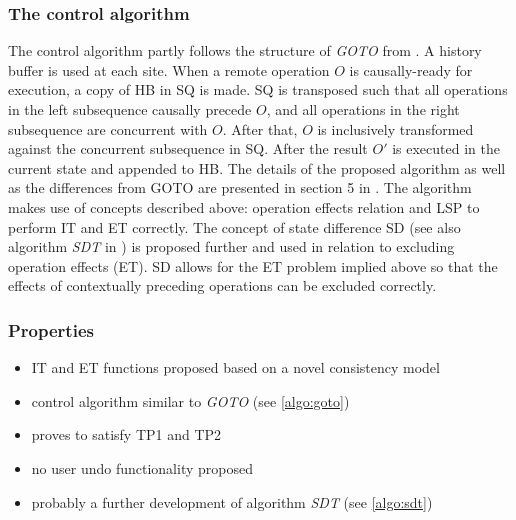 \subsubsection{The control algorithm}
The control algorithm partly follows the structure of \emph{GOTO} from \cite{sun98b}. A history buffer is used at each site. When a remote operation $O$ is causally-ready for execution, a copy of HB in SQ is made. SQ is transposed such that all operations in the left subsequence causally precede $O$, and all operations in the right subsequence are concurrent with $O$. After that, $O$ is inclusively transformed against the concurrent subsequence in SQ. After the result $O'$ is executed in the current state and appended to HB. The details of the proposed algorithm as well as the differences from GOTO are presented in section 5 in \cite{li04}. The algorithm makes use of concepts described above: operation effects relation and LSP to perform IT and ET correctly. The concept of state difference SD (see also algorithm \emph{SDT} in \cite{sdt}) is proposed further and used in relation to excluding operation effects (ET). SD allows for the ET problem implied above so that the effects of contextually preceding operations can be excluded correctly.

\subsubsection{Properties}
\begin{itemize}
 \item IT and ET functions proposed based on a novel consistency model
 \item control algorithm similar to \emph{GOTO} (see \ref{algo:goto})
 \item proves to satisfy TP1 and TP2
 \item no user undo functionality proposed
 \item probably a further development of algorithm \emph{SDT} (see \ref{algo:sdt})
\end{itemize}